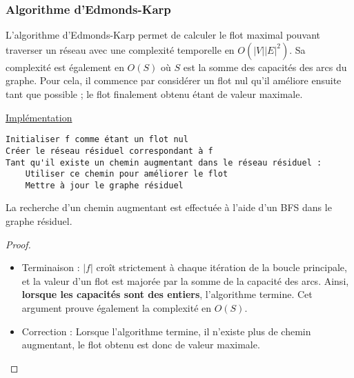 \documentclass[11pt,a4paper]{article}
\begin{document}
    \subsubsection{Algorithme d'Edmonds-Karp}
L'algorithme d'Edmonds-Karp permet de calculer le flot maximal pouvant traverser un réseau avec une complexité temporelle en \(O(|V| |E|^2)\). Sa complexité est également en \(O(S)\) où \(S\) est la somme des capacités des arcs du graphe. Pour cela, il commence par considérer un flot nul qu'il améliore ensuite tant que possible ; le flot finalement obtenu étant de valeur maximale.

\noindent\href{https://github.com/AdrienVannson/algo-lib/blob/master/include/graphs/algorithms/edmonds-karp.hpp}{Implémentation}
\begin{lstlisting}
Initialiser f comme étant un flot nul
Créer le réseau résiduel correspondant à f
Tant qu'il existe un chemin augmentant dans le réseau résiduel :
    Utiliser ce chemin pour améliorer le flot
    Mettre à jour le graphe résiduel
\end{lstlisting}

La recherche d'un chemin augmentant est effectuée à l'aide d'un BFS dans le graphe résiduel.

\begin{proof} \leavevmode
  \begin{itemize}
    \item Terminaison : \(|f|\) croît strictement à chaque itération de la boucle principale, et la valeur d'un flot est majorée par la somme de la capacité des arcs. Ainsi, \textbf{lorsque les capacités sont des entiers}, l'algorithme termine. Cet argument prouve également la complexité en \(O(S)\).
    \item Correction : Lorsque l'algorithme termine, il n'existe plus de chemin augmentant, le flot obtenu est donc de valeur maximale.
  \end{itemize}
\end{proof}


\end{document}
